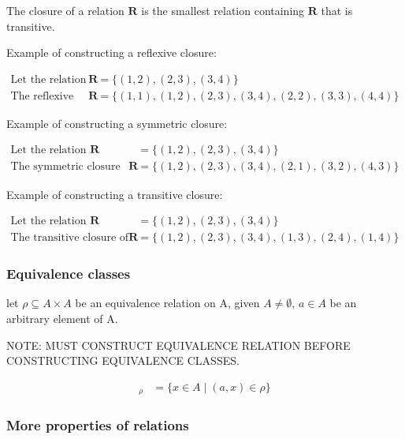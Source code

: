 \documentclass{article}
\begin{document}
The closure of a relation $\mathbf{R}$ is the smallest relation containing $\mathbf{R}$ that is transitive.

Example of constructing a reflexive closure:

\begin{align*}
    \text{Let the relation } \mathbf{R}         & = \{(1, 2), (2, 3), (3, 4)\}                                 \\
    \text{The reflexive closure of } \mathbf{R} & = \{(1, 1), (1, 2), (2, 3), (3, 4), (2, 2), (3, 3), (4, 4)\}
\end{align*}

Example of constructing a symmetric closure:

\begin{align*}
    \text{Let the relation } \mathbf{R}         & = \{(1, 2), (2, 3), (3, 4)\}                         \\
    \text{The symmetric closure of } \mathbf{R} & = \{(1, 2), (2, 3), (3, 4), (2, 1), (3, 2), (4, 3)\}
\end{align*}

Example of constructing a transitive closure:

\begin{align*}
    \text{Let the relation } \mathbf{R}          & = \{(1, 2), (2, 3), (3, 4)\}                         \\
    \text{The transitive closure of } \mathbf{R} & = \{(1, 2), (2, 3), (3, 4), (1, 3), (2, 4), (1, 4)\}
\end{align*}


\subsubsection{Equivalence classes}

let $\rho \subseteq A \times A$ be an equivalence relation on A, given $A \neq \emptyset$, $a \in A$ be an arbitrary element of A.

NOTE: MUST CONSTRUCT EQUIVALENCE RELATION BEFORE CONSTRUCTING EQUIVALENCE CLASSES.

\begin{align*}
    [a]_{\rho} & = \{x \in A \mid (a, x) \in \rho\}
\end{align*}

\subsubsection{More properties of relations}
\end{document}

